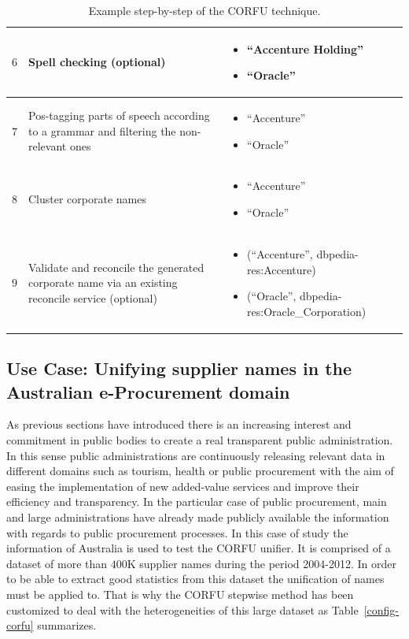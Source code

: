 \documentclass{llncs}
\begin{document}
\begin{table}[!htb]
\begin{center}
\begin{tabular}{|p{1cm}|p{5.5cm}|p{5.5cm}|}
  $6$ & Spell checking (optional) & \begin{itemize}  \item  ``Accenture Holding'' \item  ``Oracle'' \end{itemize} \\ \hline
  $7$ & Pos-tagging parts of speech according to a grammar and filtering the non-relevant ones & \begin{itemize}  \item  ``Accenture'' \item  ``Oracle'' \end{itemize} \\ \hline
  $8$ & Cluster corporate names & \begin{itemize}  \item  ``Accenture'' \item  ``Oracle'' \end{itemize} \\ \hline
  $9$ & Validate and reconcile the generated corporate name via an existing reconcile service (optional) & \begin{itemize}  \item  (``Accenture'', dbpedia-res:Accenture) \item  (``Oracle'', dbpedia-res:Oracle\_Corporation) \end{itemize} \\ \hline
  \hline
  \end{tabular}
  \caption{Example step-by-step of the CORFU technique.}
  \label{tabla:corfu-examples}
  \end{center}
\end{table} 
\clearpage

\subsection{Use Case: Unifying supplier names in the Australian e-Procurement domain}
As previous sections have introduced there is an increasing interest and commitment 
in public bodies to create a real transparent public administration. In this sense 
public administrations are continuously releasing relevant data in different domains 
such as tourism, health or public procurement with the aim of easing the implementation 
of new added-value services and improve their efficiency and transparency. In the particular 
case of public procurement, main and large administrations have already made publicly available the information 
with regards to public procurement processes. In this case of study the information of Australia is used 
to test the CORFU unifier. It is comprised of a dataset of more than $400$K supplier names during the period 2004-2012. In order to be able to extract 
good statistics from this dataset the unification of names must be applied to. That is why 
the CORFU stepwise method has been customized to deal with the heterogeneities of this large 
dataset as Table~\ref{config-corfu} summarizes.
\end{document}
